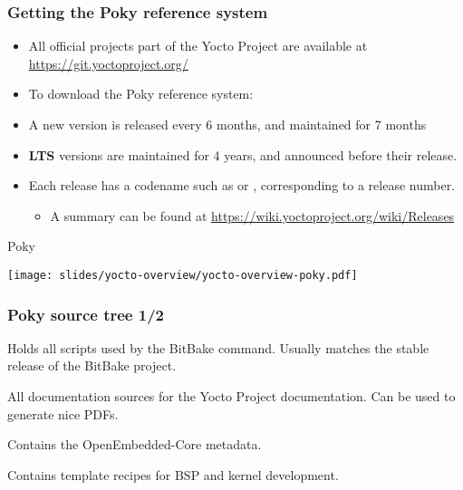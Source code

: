 \begin{frame}
  \frametitle{Getting the Poky reference system}
  \begin{itemize}
    \item All official projects part of the Yocto Project are
          available at \url{https://git.yoctoproject.org/}
    \item To download the Poky reference system: \\
          {\small
          }
    \item A new version is released every 6 months, and maintained for 7 months
    \item \textbf{LTS} versions are maintained for 4 years, and announced before their release.
    \item Each release has a codename such as  or ,
	  corresponding to a release number.
		  \begin{itemize}
			  \item A summary can be found at \url{https://wiki.yoctoproject.org/wiki/Releases}
		  \end{itemize}
  \end{itemize}
\end{frame}

\begin{frame}{Poky}
  \begin{center}
    \texttt{[image: slides/yocto-overview/yocto-overview-poky.pdf]}
  \end{center}
\end{frame}

\begin{frame}
  \frametitle{Poky source tree 1/2}
  \begin{description}[style=nextline]
  \item[bitbake/] Holds all scripts used by the BitBake command.
    Usually matches the stable release of the BitBake project.
  \item[documentation/] All documentation sources for the Yocto
    Project documentation. Can be used to generate nice PDFs.
  \item[meta/] Contains the OpenEmbedded-Core metadata.
  \item[meta-skeleton/] Contains template recipes for BSP and
    kernel development.
  \end{description}
\end{frame}

